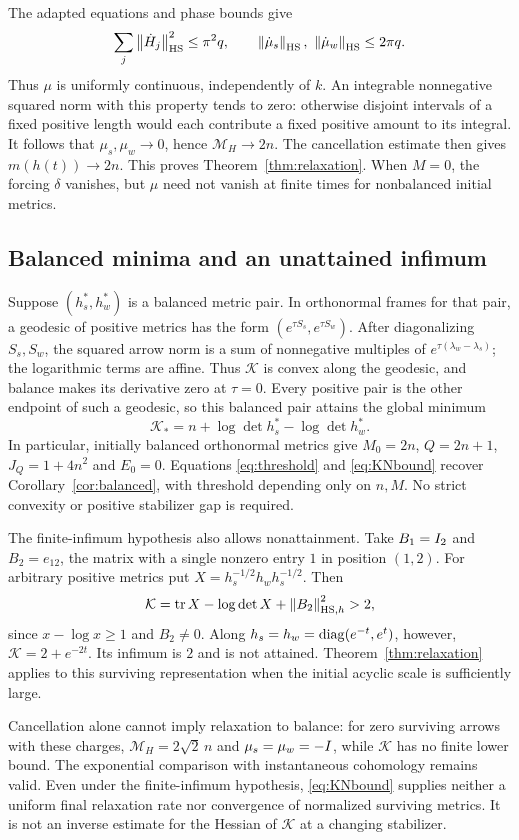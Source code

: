 The adapted equations and phase bounds give
\[
 \sum_j\left\lVert\dot H_j\right\rVert_{\mathrm{HS}}^2\leq\pi^2q,\qquad
 \left\lVert\dot\mu_s\right\rVert_{\mathrm{HS}},\ \left\lVert\dot\mu_w\right\rVert_{\mathrm{HS}}\leq2\pi q.
\]
Thus $\mu$ is uniformly continuous, independently of $k$.
An integrable nonnegative squared norm with this property tends to zero:
otherwise disjoint intervals of a fixed positive length would each
contribute a fixed positive amount to its integral.
It follows that $\mu_s,\mu_w\to0$, hence $\mathcal M_H\to2n$.
The cancellation estimate then gives $m(h(t))\to2n$.
This proves Theorem~\ref{thm:relaxation}.
When $M=0$, the forcing $\delta$ vanishes, but $\mu$ need not vanish
at finite times for nonbalanced initial metrics.

\subsection{Balanced minima and an unattained infimum}
Suppose $(h_s^*,h_w^*)$ is a balanced metric pair.
In orthonormal frames for that pair, a geodesic of positive metrics
has the form $(e^{\tau S_s},e^{\tau S_w})$.
After diagonalizing $S_s,S_w$, the squared arrow norm is a sum of
nonnegative multiples of $e^{\tau(\lambda_w-\lambda_s)}$;
the logarithmic terms are affine. Thus $\mathcal K$ is convex along
the geodesic, and balance makes its derivative zero at $\tau=0$.
Every positive pair is the other endpoint of such a geodesic, so
this balanced pair attains the global minimum
\[
 \mathcal K_*=n+\log\det h_s^*-\log\det h_w^*.
\]
In particular, initially balanced orthonormal metrics give
$M_0=2n$, $Q=2n+1$, $J_Q=1+4n^2$ and $E_0=0$.
Equations \eqref{eq:threshold} and \eqref{eq:KNbound} recover
Corollary~\ref{cor:balanced}, with threshold depending only on $n,M$.
No strict convexity or positive stabilizer gap is required.

The finite-infimum hypothesis also allows nonattainment.
Take $B_1=I_2$ and $B_2=e_{12}$, the matrix with a single nonzero
entry $1$ in position $(1,2)$.
For arbitrary positive metrics put
$X=h_s^{-1/2}h_wh_s^{-1/2}$. Then
\[
 \mathcal K=\operatorname{tr} X-\log\det X+\left\lVert B_2\right\rVert_{\mathrm{HS},h}^2>2,
\]
since $x-\log x\geq1$ and $B_2\ne0$.
Along $h_s=h_w=\operatorname{diag}(e^{-t},e^t)$, however,
$\mathcal K=2+e^{-2t}$. Its infimum is $2$ and is not attained.
Theorem~\ref{thm:relaxation} applies to this surviving representation
when the initial acyclic scale is sufficiently large.

Cancellation alone cannot imply relaxation to balance: for zero
surviving arrows with these charges, $\mathcal M_H=2\sqrt2\,n$ and
$\mu_s=\mu_w=-I$, while $\mathcal K$ has no finite lower bound.
The exponential comparison with instantaneous cohomology remains valid.
Even under the finite-infimum hypothesis, \eqref{eq:KNbound} supplies
neither a uniform final relaxation rate nor convergence of normalized
surviving metrics. It is not an inverse estimate for the Hessian of
$\mathcal K$ at a changing stabilizer.
